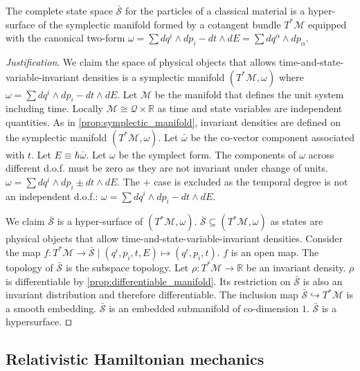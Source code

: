 \documentclass[smallextended]{svjour3}
\numberwithin{equation}{section}
\newenvironment{justification}{\emph{Justification}.}{\hfill\(\qed\)}
\begin{document}
\begin{prop}\label{prop:relativistic_symplectic_manifold}
	The complete state space $\bar{\mathcal{S}}$ for the particles of a classical material is a hyper-surface of the symplectic manifold formed by a cotangent bundle $T^*\mathcal{M}$ equipped with the canonical two-form $\omega = \sum dq^i \wedge dp_i - dt \wedge dE = \sum dq^\alpha \wedge dp_\alpha$.
\end{prop}

\begin{justification}
	We claim the space of physical objects that allows time-and-state-variable-invariant densities is a symplectic manifold $(T^*\mathcal{M}, \omega)$ where $\omega = \sum dq^i \wedge dp_i - dt \wedge dE$. Let $\mathcal{M}$ be the manifold that defines the unit system including time. Locally $\mathcal{M} \cong \mathcal{Q} \times \mathbb{R}$ as time and state variables are independent quantities. As in \ref{prop:symplectic_manifold}, invariant densities are defined on the symplectic manifold $(T^*\mathcal{M}, \omega)$. Let $\bar{\omega}$ be the co-vector component associated with $t$. Let $E\equiv\hbar \bar{\omega}$. Let $\omega$ be the symplect form. The components of $\omega$ across different d.o.f. must be zero as they are not invariant under change of units. $\omega=\sum dq^i \wedge dp_i \pm dt \wedge dE$. The $+$ case is excluded as the temporal degree is not an independent d.o.f.: $\omega = \sum dq^i \wedge dp_i - dt \wedge dE$.
	
	We claim $\bar{\mathcal{S}}$ is a hyper-surface of $(T^*\mathcal{M}, \omega)$. $\bar{\mathcal{S}} \subseteq (T^*\mathcal{M}, \omega)$ as states are physical objects that allow time-and-state-variable-invariant densities. Consider the map $f : T^*\mathcal{M} \rightarrow \bar{\mathcal{S}} \; | \; (q^i, p_i, t, E) \mapsto (q^i, p_i, t)$. $f$ is an open map. The topology of $\bar{\mathcal{S}}$ is the subspace topology. Let $\rho : T^*\mathcal{M} \rightarrow \mathbb{R}$ be an invariant density. $\rho$ is differentiable by \ref{prop:differentiable_manifold}. Its restriction on $\bar{\mathcal{S}}$ is also an invariant distribution and therefore differentiable. The inclusion map $\bar{\mathcal{S}} \hookrightarrow T^*\mathcal{M}$ is a smooth embedding. $\bar{\mathcal{S}}$ is an embedded submanifold of co-dimension $1$. $\bar{\mathcal{S}}$ is a hypersurface.
\end{justification}


\subsection{Relativistic Hamiltonian mechanics}
\end{document}
